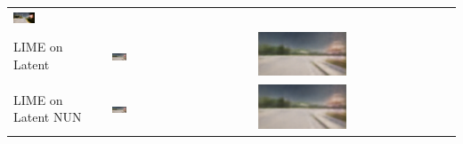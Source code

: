 \begin{table}[htbp]
\begin{tabular}{>{\centering\arraybackslash}p{3.5cm} >{\centering\arraybackslash}c >{\centering\arraybackslash}c}
        \includegraphics[width=0.3\textwidth]{img/masking_results/lime_image_cf.png} \\
        \addlinespace
        LIME on Latent & 
        \includegraphics[width=0.3\textwidth]{img/masking_results/original.png} & 
        \includegraphics[width=0.3\textwidth]{img/masking_results/lime_latent_cf.png} \\
        \addlinespace
        LIME on Latent NUN & 
        \includegraphics[width=0.3\textwidth]{img/masking_results/original.png} & 
        \includegraphics[width=0.3\textwidth]{img/masking_results/lime_NUN_cf.png} \\
        \bottomrule
    \end{tabular}
\end{table}


